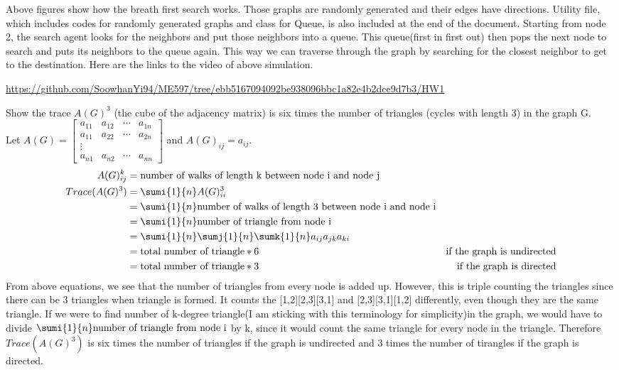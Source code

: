 \documentclass{article}
\begin{document}
\begin{problem}
\begin{figure}[!h]
\end{figure}
Above figures show how the breath first search works. Those graphs are randomly generated and their edges have directions. Utility file, which includes codes for randomly generated graphs and class for Queue, is also included at the end of the document. Starting from node 2, the search agent looks for the neighbors and put those neighbors into a queue. This queue(first in first out) then pops the next node to search and puts its neighbors to the queue again. This way we can traverse through the graph by searching for the closest neighbor to get to the destination. Here are the links to the video of above simulation.

\url{https://github.com/SoowhanYi94/ME597/tree/ebb5167094092be938096bbc1a82e4b2dce9d7b3/HW1}

\end{problem}

\begin{problem}
    Show the trace $A(G)^3$ (the cube of the adjacency matrix) is six times the number of triangles (cycles with length 3) in the graph G.\\
    Let $A(G) = \begin{bmatrix*}
        a_{11} & a_{12} & \cdots & a_{1n} \\
        a_{11} & a_{22} & \cdots & a_{2n} \\
        \vdots & &&\\
        a_{n1} & a_{n2} & \cdots & a_{nn}
    \end{bmatrix*}$ and $A(G)_{ij} = a_{ij}$.
    \begin{align*}
         A(G)_{ij} ^k &= \text{number of walks of length k between node i and node j}\\
         Trace(A(G)^3) &= \sumi{1}{n} A(G)_{ii}^3 \\
         &= \sumi{1}{n} \text{number of walks of length 3 between node i and node i} \\
         &= \sumi{1}{n} \text{number of triangle from node i} \\
         &= \sumi{1}{n} \sumj{1}{n} \sumk{1}{n}a_{ij} a_{jk} a_{ki}\\
         &= \text{total number of triangle} * 6  & \text{if the graph is undirected}\\
         &= \text{total number of triangle} * 3  & \text{if the graph is directed}
    \end{align*}
    From above equations, we see that the number of triangles from every node is added up. However, this is triple counting the triangles since there can be 3 triangles when triangle is formed. It counts the [1,2][2,3][3,1] and [2,3][3,1][1,2] differently, even though they are the same triangle.  If we were to find number of k-degree triangle(I am sticking with this terminology for simplicity)in the graph, we would have to divide $\sumi{1}{n} \text{number of triangle from node i}$ by k, since it would count the same triangle for every node in the triangle. Therefore $Trace(A(G)^3)$ is six times the number of triangles if the graph is undirected and 3 times the number of tirangles if the graph is directed. 

\end{problem}
\end{document}

